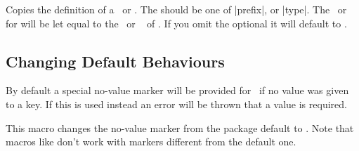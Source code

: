 \begin{function}{\ekvpLet}
  \begin{syntax}
  \end{syntax}
  Copies the definition of a \prefix\ or \type. The  should be one of
  |prefix|, or |type|. The \prefix\ or \type\  for 
  will be let equal to the \prefix\ or \type\  of .
  If you omit the optional  it will default to .
\end{function}


\subsection{Changing Default Behaviours}

\begin{function}{\ekvpValueAlwaysRequired}
  \begin{syntax}
  \end{syntax}
  By default a special no-value marker will be provided for \val\ if no value
  was given to a key. If this is used instead an error will be thrown that a
  value is required.
\end{function}


\begin{function}{\ekvpUseNoValueMarker}
  \begin{syntax}
  \end{syntax}
  This macro changes the no-value marker from the package default to
  \meta{marker}. Note that macros like \cs{ekvpAssertValue} don't work with
  markers different from the default one.
\end{function}

